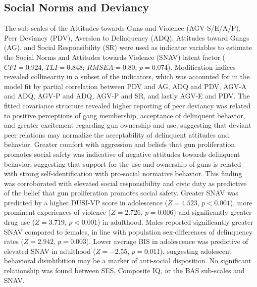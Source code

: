 \documentclass[utf8]{article}
\begin{document}
\subsection{Social Norms and Deviancy} The sub-scales of the Attitudes towards Guns and Violence (AGV-S/E/A/P), Peer Deviancy (PDV), Aversion to Delinquency (ADQ), Attitudes toward Gangs (AG), and Social Responsibility (SR) were used as indicator variables to estimate the Social Norms and Attitudes towards Violence (SNAV) latent factor ($CFI=0.924$, $TLI=0.848$; $RMSEA=0.80$, $p=0.074$). Modification indices revealed collinearity in a subset of the indicators, which was accounted for in the model fit by partial correlation between PDV and AG, ADQ and PDV, AGV-A and ADQ, AGV-P and ADQ, AGV-P and SR, and lastly AGV-E and PDV. The fitted covariance structure revealed higher reporting of peer deviancy was related to positive perceptions of gang membership, acceptance of delinquent behavior, and greater excitement regarding gun ownership and use; suggesting that deviant peer relations may normalize the acceptability of delinquent attitudes and behavior. Greater comfort with aggression and beliefs that gun proliferation promotes social safety was indicative of negative attitudes towards delinquent behavior, suggesting that support for the use and ownership of guns is related with strong self-identification with pro-social normative behavior. This finding was corroborated with elevated social responsibility and civic duty as predictive of the belief that gun proliferation promotes social safety. Greater SNAV was predicted by a higher DUSI-VP score in adolescence ($Z=4.523$, $p<0.001$), more prominent experiences of violence ($Z=2.726$, $p=0.006$) and significantly greater drug use ($Z=3.719$, $p<0.001$) in adulthood. Males reported significantly greater SNAV compared to females, in line with population sex-differences of delinquency rates ($Z=2.942$, $p=0.003$). Lower average BIS in adolescence was predictive of elevated SNAV in adulthood ($Z=-2.55$, $p=0.011$), suggesting adolescent behavioral disinhibition may be a marker of anti-social disposition. No significant relationship was found between SES, Composite IQ, or the BAS sub-scales and SNAV.
\end{document}
